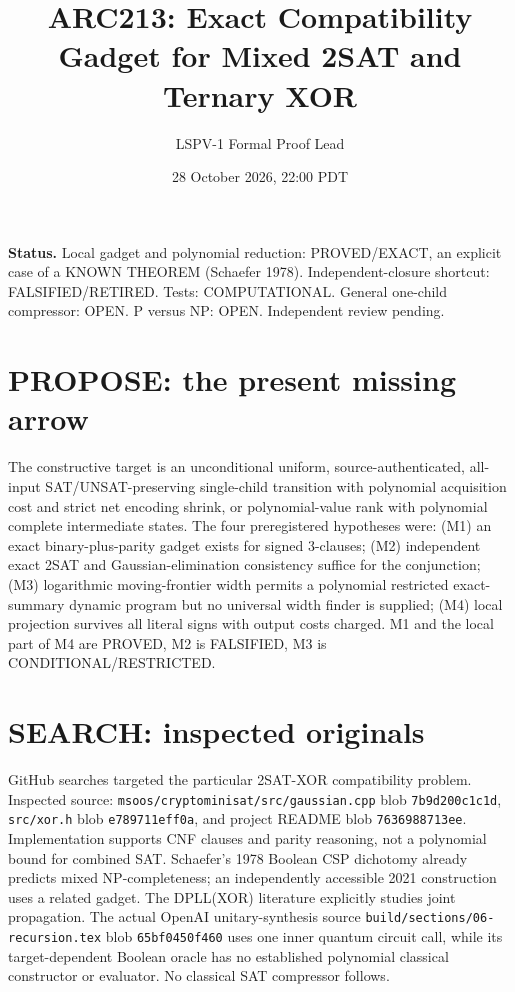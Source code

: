 \documentclass[11pt]{article}
\title{ARC213: Exact Compatibility Gadget for Mixed 2SAT and Ternary XOR}
\author{LSPV-1 Formal Proof Lead}\date{28 October 2026, 22:00 PDT}
\begin{document}
\maketitle
\noindent\textbf{Status.} Local gadget and polynomial reduction: PROVED/EXACT, an explicit case of a KNOWN THEOREM (Schaefer 1978). Independent-closure shortcut: FALSIFIED/RETIRED. Tests: COMPUTATIONAL. General one-child compressor: OPEN. P versus NP: OPEN. Independent review pending.

\section{PROPOSE: the present missing arrow}
The constructive target is an unconditional uniform, source-authenticated, all-input SAT/UNSAT-preserving single-child transition with polynomial acquisition cost and strict net encoding shrink, or polynomial-value rank with polynomial complete intermediate states. The four preregistered hypotheses were: (M1) an exact binary-plus-parity gadget exists for signed 3-clauses; (M2) independent exact 2SAT and Gaussian-elimination consistency suffice for the conjunction; (M3) logarithmic moving-frontier width permits a polynomial restricted exact-summary dynamic program but no universal width finder is supplied; (M4) local projection survives all literal signs with output costs charged. M1 and the local part of M4 are PROVED, M2 is FALSIFIED, M3 is CONDITIONAL/RESTRICTED.

\section{SEARCH: inspected originals}
GitHub searches targeted the particular 2SAT-XOR compatibility problem. Inspected source: \texttt{msoos/cryptominisat/src/gaussian.cpp} blob \texttt{7b9d200c1c1d}, \texttt{src/xor.h} blob \texttt{e789711eff0a}, and project README blob \texttt{7636988713ee}. Implementation supports CNF clauses and parity reasoning, not a polynomial bound for combined SAT. Schaefer's 1978 Boolean CSP dichotomy already predicts mixed NP-completeness; an independently accessible 2021 construction uses a related gadget. The DPLL(XOR) literature explicitly studies joint propagation. The actual OpenAI unitary-synthesis source \texttt{build/sections/06-recursion.tex} blob \texttt{65bf0450f460} uses one inner quantum circuit call, while its target-dependent Boolean oracle has no established polynomial classical constructor or evaluator. No classical SAT compressor follows.
\end{document}
